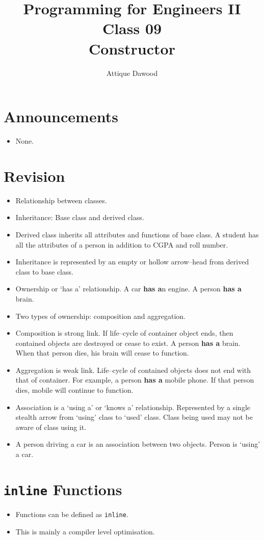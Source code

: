 \documentclass[12pt,a4paper]{article}
\title{\vspace{-2cm}Programming for Engineers II\\Class 09\\Constructor}
\author{Attique Dawood}
\begin{document}
\maketitle
\section{Announcements}
\begin{itemize}
\item None.
\end{itemize}
\section{Revision}
\begin{itemize}
\item Relationship between classes.
\item Inheritance: Base class and derived class.
\item Derived class inherits all attributes and functions of base class. A student has all the attributes of a person in addition to CGPA and roll number.
\item Inheritance is represented by an empty or hollow arrow--head from derived class to base class.
\item Ownership or `has a' relationship. A car \textbf{has a}n engine. A person \textbf{has a} brain.
\item Two types of ownership: composition and aggregation.
\item Composition is strong link. If life--cycle of container object ends, then contained objects are destroyed or cease to exist. A person \textbf{has a} brain. When that person dies, his brain will cease to function.
\item Aggregation is weak link. Life--cycle of contained objects does not end with that of container. For example, a person \textbf{has a} mobile phone. If that person dies, mobile will continue to function.
\item Association is a `using a' or `knows a' relationship. Represented by a single stealth arrow from `using' class to `used' class. Class being used may not be aware of class using it.
\item A person driving a car is an association between two objects. Person is `using' a car.
\end{itemize}
\section{\texttt{inline} Functions}
\begin{itemize}
\item Functions can be defined as \verb|inline|.
\item This is mainly a compiler level optimisation.
\end{itemize}
\end{document}
